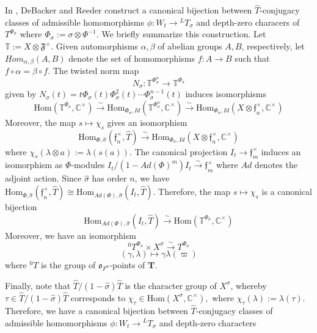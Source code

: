 \documentclass[11pt]{amsart}
\theoremstyle{plain}
\theoremstyle{definition}
\begin{document}
In \cite[Chapter 4]{debackerreeder}, DeBacker and Reeder construct a
canonical bijection between $\hat{T}$-conjugacy classes of admissible
homomorphisms $\phi : W_t \rightarrow {}^L T_{\sigma}$ and depth-zero
characers of $T^{\Phi_{\sigma}}$ where
$\Phi_{\sigma} := \sigma \otimes \Phi^{-1}$.  We briefly summarize
this construction. Let $\mathbb{T} := X \otimes \mathfrak{F}^\times$.
Given automorphisms $\alpha, \beta$ of abelian groups $A,B$,
respectively, let $Hom_{\alpha, \beta}(A,B)$ denote the set of
homomorphisms $f : A \rightarrow B$ such that $f \circ \alpha = \beta \circ f$.
The twisted norm map
$$N_{\sigma} : \mathbb{T}^{\Phi_{\sigma}^n} \rightarrow \mathbb{T}^{\Phi_{\sigma}}$$
given by
$N_{\sigma}(t) = t \Phi_{\sigma}(t) \Phi_{\sigma}^2(t) \cdots \Phi_{\sigma}^{n-1}(t)$
induces isomorphisms
$$\mathrm{Hom}(\mathbb{T}^{\Phi_{\sigma}},
  \mathbb{C}^\times) \stackrel{\sim}{\rightarrow}
  \mathrm{Hom}_{\Phi_{\sigma}, Id}(\mathbb{T}^{\Phi_{\sigma}^n},
  \mathbb{C}^\times) \stackrel{\sim}{\rightarrow}
  \mathrm{Hom}_{\Phi_{\sigma}, Id}(X \otimes \mathfrak{f}_n^\times, \mathbb{C}^\times)$$
Moreover, the map $s \mapsto \chi_s$ gives an isomorphism
$$\mathrm{Hom}_{\Phi, \hat{\sigma}}(\mathfrak{f}_n^\times, \hat{T})
  \stackrel{\sim}{\rightarrow} \mathrm{Hom}_{\Phi_{\sigma},
  Id}(X \otimes \mathfrak{f}_n^\times, \mathbb{C}^\times)$$
where $\chi_s(\lambda \otimes a) := \lambda(s(a))$.  The canonical
projection $I_t \rightarrow \mathfrak{f}_m^\times$ induces an isomorphism
as $\Phi$-modules
$I_t / (1 - Ad (\Phi)^m)I_t \stackrel{\sim}{\rightarrow} \mathfrak{f}_m^\times$
where $Ad$ denotes the adjoint action.  Since $\hat{\sigma}$ has order
$n$, we have $\mathrm{Hom}_{\Phi, \hat{\sigma}}(\mathfrak{f}_n^\times,
\hat{T}) \cong \mathrm{Hom}_{Ad(\Phi), \hat{\sigma}}(I_t, \hat{T})$.
Therefore, the map $s \mapsto \chi_s$ is a canonical bijection
$$\mathrm{Hom}_{Ad(\Phi), \hat{\sigma}}(I_t, \hat{T})
  \stackrel{\sim}{\rightarrow} \mathrm{Hom}(\mathbb{T}^{\Phi_{\sigma}},
  \mathbb{C}^\times)$$
Moreover, we have an isomorphism
$${}^0T^{\Phi_{\sigma}} \times X^{\sigma} \stackrel{\sim}{\rightarrow}
  T^{\Phi_{\sigma}}$$ $$(\gamma, \lambda) \mapsto \gamma \lambda(\varpi)$$
where ${}^0 T$ is the group of $\mathfrak{o}_{F^u}$-points of $\mathbf{T}$.

Finally, note that $\hat{T} / (1 - \hat{\sigma}) \hat{T}$ is the
character group of $X^{\sigma}$, whereby
$\tau \in \hat{T} / (1 - \hat{\sigma}) \hat{T}$ corresponds to
$\chi_{\tau} \in \mathrm{Hom}(X^{\sigma}, \mathbb{C}^\times),$ where
$\chi_{\tau}(\lambda) := \lambda(\tau)$.  Therefore, we have a
canonical bijection between $\hat{T}$-conjugacy classes of admissible
homomorphisms $\phi : W_t \rightarrow {}^L T_{\sigma}$ and depth-zero
characters
\end{document}
